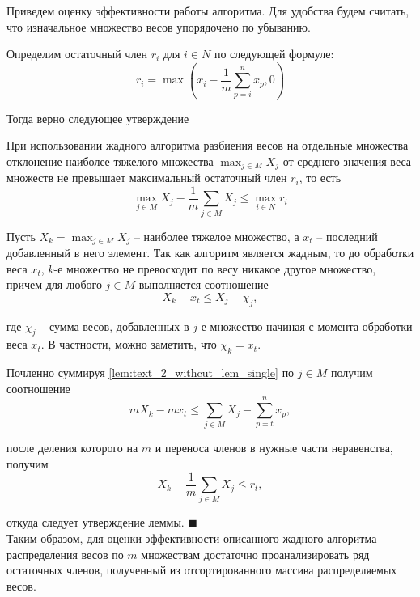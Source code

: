 Приведем оценку эффективности работы алгоритма.
Для удобства будем считать, что изначальное множество весов упорядочено по убыванию.

Определим остаточный член $r_i$ для $i \in N$ по следующей формуле:
\begin{equation}
	r_i = \max{\left( x_i - \frac{1}{m} \sum_{p = i}^{n}{x_p}, 0 \right)}
\end{equation}

Тогда верно следующее утверждение

\begin{lemma}\label{lem:text_2_withcut_lem}
При использовании жадного алгоритма разбиения весов на отдельные множества отклонение наиболее тяжелого множества $\max_{j \in M}{X_j}$ от среднего значения веса множеств не превышает максимальный остаточный член $r_i$, то есть
\begin{equation}
	\max_{j \in M}{X_j} - \frac{1}{m} \sum_{j \in M}{X_j} \le \max_{i \in N}{r_i}
\end{equation}
\end{lemma}
Пусть $X_k = \max_{j \in M}{X_j}$ -- наиболее тяжелое множество, а $x_t$ -- последний добавленный в него элемент.
Так как алгоритм является жадным, то до обработки веса $x_t$, $k$-е множество не превосходит по весу никакое другое множество, причем для любого $j \in M$ выполняется соотношение
\begin{equation}\label{lem:text_2_withcut_lem_single}
	X_k - x_t \le X_j - \chi_j,
\end{equation}	
	
где $\chi_j$ -- сумма весов, добавленных в $j$-е множество начиная с момента обработки веса $x_t$.
В частности, можно заметить, что $\chi_k = x_t$.

Почленно суммируя \eqref{lem:text_2_withcut_lem_single} по $j \in M$ получим соотношение
\begin{equation}
	m X_k - m x_t \le \sum_{j \in M}{X_j} - \sum_{p = t}^{n}{x_p},
\end{equation}

после деления которого на $m$ и переноса членов в нужные части неравенства, получим
\begin{equation}
	X_k - \frac{1}{m} \sum_{j \in M}{X_j} \le r_t,
\end{equation}

откуда следует утверждение леммы.
$\blacksquare$\\

Таким образом, для оценки эффективности описанного жадного алгоритма распределения весов по $m$ множествам достаточно проанализировать ряд остаточных членов, полученный из отсортированного массива распределяемых весов.

